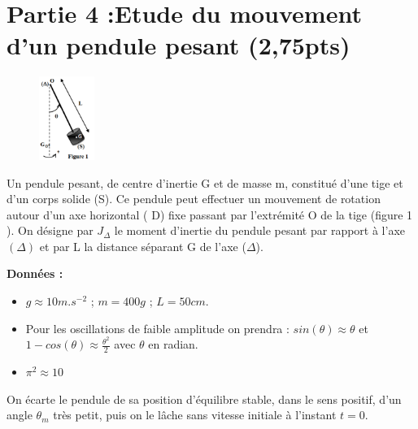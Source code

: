 \documentclass[12pt]{article}
\begin{document}
\section*{Partie 4 :Etude du mouvement d’un pendule pesant \dotfill(2,75pts)}

\begin{figure}
	\vspace{-1.2cm}
\begin{center}
  \includegraphics[width=0.16\textwidth]{./img/pendule011.png}
\end{center}
\end{figure}

Un pendule pesant, de centre d’inertie G et de masse m, constitué d’une tige et d’un corps solide (S).
Ce pendule peut effectuer un mouvement de rotation autour d’un axe horizontal ( D) fixe passant par l’extrémité O de la tige (figure 1 ).
On désigne par $J_{\Delta}$  le moment d’inertie du pendule pesant par rapport à l’axe $(\Delta)$ et par L la distance
séparant G de l’axe ($\Delta$).

\textbf{Données : }

\begin{itemize}
	\item $g \approx 10 m.s^{-2}$ ; $m = 400g$ ; $L=50cm$.
	\item Pour les oscillations de faible amplitude on prendra : $sin(\theta) \approx \theta$ et $1-cos(\theta) \approx \frac{\theta^2}{2}$ avec $\theta $ en radian.
	\item $\pi^2 \approx 10$
\end{itemize}

On écarte le pendule de sa position d’équilibre stable, dans le sens positif,
d’un angle $\theta_m$ très petit, puis on le lâche sans vitesse initiale à l’instant $t=0$.
\end{document}
